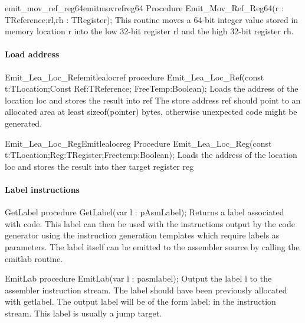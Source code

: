 \documentclass [a4paper,12pt]{article}
\begin{document}
\begin{functionl}{emit{\_}mov{\_}ref{\_}reg64}{emitmovrefreg64}
\Declaration
Procedure Emit{\_}Mov{\_}Ref{\_}Reg64(r : TReference;rl,rh : TRegister);
\Description
This routine moves a 64-bit integer value stored in memory location
\textsf{r} into the low 32-bit register \textsf{rl} and the high 32-bit
register \textsf{rh}.
\end{functionl}

\paragraph{Load address}

\begin{functionl}{Emit{\_}Lea{\_}Loc{\_}Ref}{emitlealocref}
\Declaration
procedure Emit{\_}Lea{\_}Loc{\_}Ref(const t:TLocation;Const Ref:TReference; FreeTemp:Boolean);
\Description
Loads the address of the location \textsf{loc }and stores the result into
\textsf{ref}
\Notes
The store address \textsf{ref }should point to an allocated area at least
\textsf{sizeof(pointer)} bytes, otherwise unexpected code might be
generated.
\end{functionl}

\begin{functionl}{Emit{\_}Lea{\_}Loc{\_}Reg}{Emitlealocreg}
\Declaration
Procedure Emit{\_}Lea{\_}Loc{\_}Reg(const t:TLocation;Reg:TRegister;Freetemp:Boolean);
\Description
Loads the address of the location \textsf{loc }and stores the result into
ther target register \textsf{reg}
\end{functionl}

\paragraph{Label instructions}

\begin{procedure}{GetLabel}
\Declaration
procedure GetLabel(var l : pAsmLabel);
\Description
Returns a label associated with code. This label can then be used with the
instructions output by the code generator using the instruction generation
templates which require labels as parameters. The label itself can be
emitted to the assembler source by calling the \textsf{emitlab} routine.
\end{procedure}

\begin{procedure}{EmitLab}
\Declaration
procedure EmitLab(var l : pasmlabel);
\Description
Output the label \textsf{l }to the assembler instruction stream.
\Notes
The label should have been previously allocated with \textsf{getlabel.} The
output label will be of the form label: in the instruction stream. This
label is usually a jump target.
\end{procedure}
\end{document}
